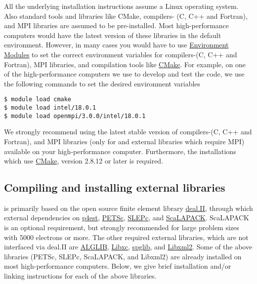 All the underlying installation instructions assume a Linux operating system. Also standard tools and libraries like CMake, compilers- (C, C++ and Fortran), and MPI libraries are assumed to be pre-installed. Most high-performance computers would have the latest version of these libraries in the default environment. However, in many cases you would have to use \href{http://modules.sourceforge.net/}{Environment Modules} to set the correct environment variables for compilers-(C, C++ and Fortran), MPI libraries, and compilation tools like \href{http://www.cmake.org/}{CMake}. For example, on one of the high-performance computers we use to develop and test the \dftfe{} code, we use the following commands to set the desired environment variables
\begin{verbatim}
$ module load cmake
$ module load intel/18.0.1
$ module load openmpi/3.0.0/intel/18.0.1
\end{verbatim}
We strongly recommend using the latest stable version of compilers-(C, C++ and Fortran), and MPI libraries (only for \dftfe{} and external libraries which require MPI) available on your high-performance computer. Furthermore, the installations which use \href{http://www.cmake.org/}{CMake}, version 2.8.12 or later is required.   

\subsection{Compiling and installing external libraries}
\dftfe{} is primarily based on the open source finite element library \href{http://www.dealii.org/}{deal.II}, through which external dependencies
on \href{http://p4est.org/}{p4est}, \href{https://www.mcs.anl.gov/petsc/}{PETSc}, \href{http://slepc.upv.es/}{SLEPc}, and \href{http://www.netlib.org/scalapack/}{ScaLAPACK}. ScaLAPACK is an optional requirement, but strongly recommended for large problem sizes with 5000 electrons or more. The other required external libraries, which are
not interfaced via deal.II are \href{http://www.alglib.net/}{ALGLIB}, \href{http://www.tddft.org/programs/libxc/}{Libxc}, \href{https://atztogo.github.io/spglib/}{spglib}, and \href{http://www.xmlsoft.org/}{Libxml2}. Some of the above libraries (PETSc, SLEPc, ScaLAPACK, and Libxml2) are already installed on most high-performance computers. Below, we give brief installation and/or linking instructions for each of the above libraries.

